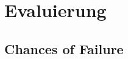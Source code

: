 \chapter{Evaluierung}\label{chp:Evaluierung}
\paragraph{}


\section{Chances of Failure}
\paragraph{}
